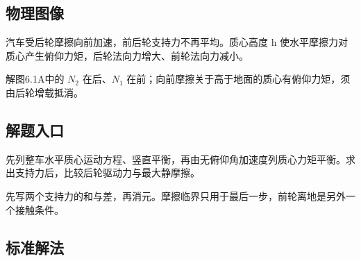\documentclass[UTF8,fontset=fandol,a4paper,11pt]{ctexart}
\begin{document}

\subsection*{物理图像}

汽车受后轮摩擦向前加速，前后轮支持力不再平均。质心高度 h
使水平摩擦力对质心产生俯仰力矩，后轮法向力增大、前轮法向力减小。

解图6.1A中的 $N_2$ 在后、$N_1$ 在前；向前摩擦关于高于地面的质心有俯仰力矩，须由后轮增载抵消。



\subsection*{解题入口}

先列整车水平质心运动方程、竖直平衡，再由无俯仰角加速度列质心力矩平衡。求出支持力后，比较后轮驱动力与最大静摩擦。

先写两个支持力的和与差，再消元。摩擦临界只用于最后一步，前轮离地是另外一个接触条件。



\subsection*{标准解法}
\end{document}
